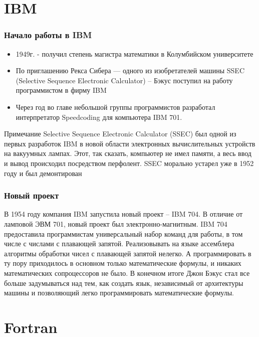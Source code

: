 \documentclass{beamer}
\begin{document}
\section{IBM}

\begin{frame}
\frametitle{Начало работы в IBM}

\begin{itemize}
	\item 1949г. - получил степень магистра математики в Колумбийском университете
	\item По приглашению Рекса Сибера — одного из изобретателей машины SSEC (Selective Sequence Electronic Calculator) – Бэкус поступил на работу программистом в фирму IBM
	\item Через год во главе небольшой группы программистов разработал интерпретатор Speedcoding для компьютера IBM 701.
\end{itemize}

\begin{block}{Примечание}
Selective Sequence Electronic Calculator (SSEC) был одной из первых разработок IBM в новой области электронных вычислительных устройств на вакуумных лампах. Этот, так сказать, компьютер не имел памяти, а весь ввод и вывод происходил посредством перфолент. SSEC морально устарел уже в 1952 году и был демонтирован
\end{block}
\end{frame}


\begin{frame}
\frametitle{Новый проект}
В 1954 году компания IBM запустила новый проект – IBM 704. В отличие от ламповой ЭВМ 701, новый проект был электронно-магнитным. IBM 704 предоставила программистам универсальный набор команд для работы, в том числе с числами с плавающей запятой. Реализовывать на языке ассемблера алгоритмы обработки чисел с плавающей запятой нелегко. А программировать в ту пору приходилось в основном только математические формулы, и никаких математических сопроцессоров не было. В конечном итоге Джон Бэкус стал все больше задумываться над тем, как создать язык, независимый от архитектуры машины и позволяющий легко программировать математические формулы.
\end{frame}

\section{Fortran}
\end{document}
